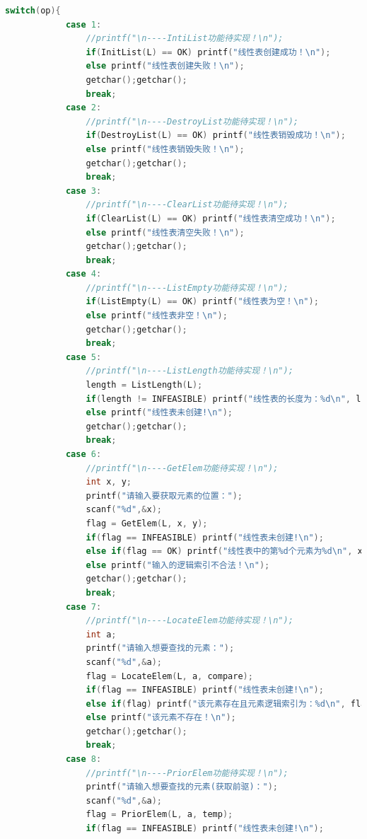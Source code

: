 \documentclass[supercite]{Experimental_Report}
\theoremstyle{definition}
\begin{document}
\begin{lstlisting}[language=c]
        switch(op){
            case 1:
                //printf("\n----IntiList功能待实现！\n");
                if(InitList(L) == OK) printf("线性表创建成功！\n");
                else printf("线性表创建失败！\n");
                getchar();getchar();
                break;
            case 2:
                //printf("\n----DestroyList功能待实现！\n");
                if(DestroyList(L) == OK) printf("线性表销毁成功！\n");
                else printf("线性表销毁失败！\n");
                getchar();getchar();
                break;
            case 3:
                //printf("\n----ClearList功能待实现！\n");
                if(ClearList(L) == OK) printf("线性表清空成功！\n");
                else printf("线性表清空失败！\n");
                getchar();getchar();
                break;
            case 4:
                //printf("\n----ListEmpty功能待实现！\n");
                if(ListEmpty(L) == OK) printf("线性表为空！\n");
                else printf("线性表非空！\n");
                getchar();getchar();
                break;
            case 5:
                //printf("\n----ListLength功能待实现！\n");
                length = ListLength(L);
                if(length != INFEASIBLE) printf("线性表的长度为：%d\n", length);
                else printf("线性表未创建!\n");
                getchar();getchar();
                break;
            case 6:
                //printf("\n----GetElem功能待实现！\n");
                int x, y;
                printf("请输入要获取元素的位置：");
                scanf("%d",&x);
                flag = GetElem(L, x, y);
                if(flag == INFEASIBLE) printf("线性表未创建!\n");
                else if(flag == OK) printf("线性表中的第%d个元素为%d\n", x, y);
                else printf("输入的逻辑索引不合法！\n");
                getchar();getchar();
                break;
            case 7:
                //printf("\n----LocateElem功能待实现！\n");
                int a;
                printf("请输入想要查找的元素：");
                scanf("%d",&a);
                flag = LocateElem(L, a, compare);
                if(flag == INFEASIBLE) printf("线性表未创建!\n");
                else if(flag) printf("该元素存在且元素逻辑索引为：%d\n", flag);
                else printf("该元素不存在！\n");
                getchar();getchar();
                break;
            case 8:
                //printf("\n----PriorElem功能待实现！\n");
                printf("请输入想要查找的元素(获取前驱)：");
                scanf("%d",&a);
                flag = PriorElem(L, a, temp);
                if(flag == INFEASIBLE) printf("线性表未创建!\n");

\end{lstlisting}
\end{document}
